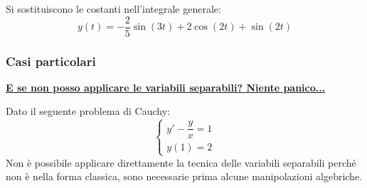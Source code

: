 \documentclass[a4paper]{article}
\newcommand{\example}[1]{\textcolor{Green4}{\textbf{#1}}}
\begin{document}
	Si sostituiscono le costanti nell'integrale generale:
	\begin{equation*}
		y\left(t\right) = -\dfrac{2}{5}\sin\left(3t\right) + 2\cos\left(2t\right) + \sin\left(2t\right)
	\end{equation*}\newpage

	\subsubsection{Casi particolari}\label{subsubsection: casi particolari equazioni differenziali}

	\begin{flushleft}
		\example{\underline{E se non posso applicare le variabili separabili? Niente panico...}}
	\end{flushleft}

	\noindent
	Dato il seguente problema di Cauchy:
	\begin{equation*}
		\begin{cases}
			y' - \dfrac{y}{x} = 1 \\
			y\left(1\right) = 2
		\end{cases}
	\end{equation*}
	Non è possibile applicare direttamente la tecnica delle variabili separabili perché non è nella forma classica, sono necessarie prima alcune manipolazioni algebriche.\newline
\end{document}
